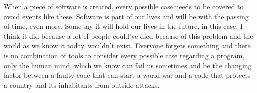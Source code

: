 \documentclass[12pt,a4paper,notitlepage]{article}
\begin{document}
When a piece of software is created, every possible case needs to be covered to avoid events like these.
Software is part of our lives and will be with the passing of time, even more.
Some say it will hold our lives in the future, in this case, I think it did because a lot of people could’ve died because of this problem and the world as we know it today, wouldn’t exist.
Everyone forgets something and there is no combination of tools to consider every possible case regarding a program, only the human mind, which we know can fail us sometimes and be the changing factor between a faulty code that can start a world war and a code that protects a country and its inhabitants from outside attacks.

\nocite{*}

\printbibliography
\end{document}
